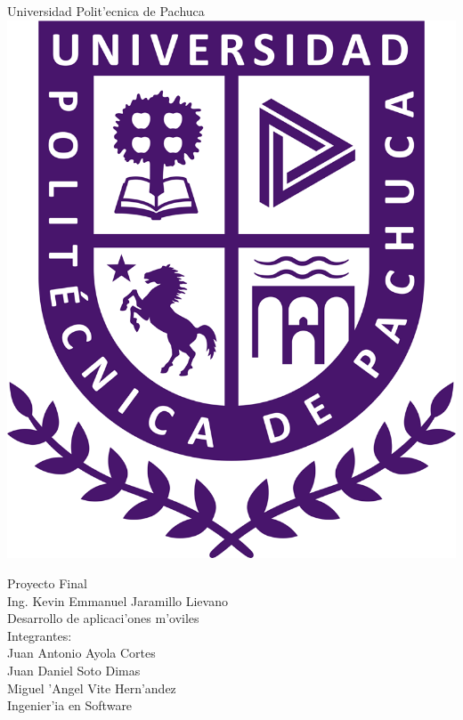 \begin{titlepage}
	\begin{center}
		\sc \LARGE Universidad Polit'ecnica de Pachuca\\
		\bigskip
		\includegraphics[scale=0.2]{img/logo.png}
	\end{center}
	\bigskip
	\begin{center}
		\huge{Proyecto Final\\}
		\vspace*{1cm}
		\sc \LARGE Ing. Kevin Emmanuel Jaramillo Lievano\\
		\vspace*{0.5cm}
		\sc \LARGE Desarrollo de aplicaci'ones m'oviles\\
		\vspace*{0.5cm}
		\sc \LARGE Integrantes: \\
	    \sc \Large Juan Antonio Ayola Cortes \\
	    \sc \Large Juan Daniel Soto Dimas \\
		\sc \Large Miguel 'Angel Vite Hern'andez \\
		\vfill
		\sc Ingenier'ia en Software
	\end{center}
\end{titlepage}
